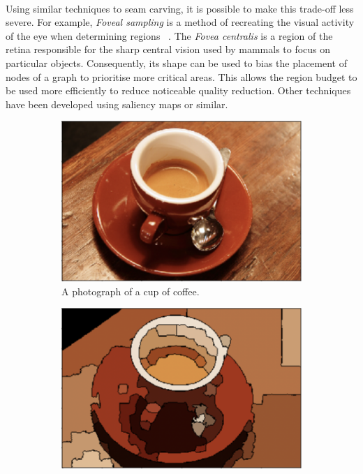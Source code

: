\smallskip \\ \indent
Using similar techniques to seam carving, it is possible to make this trade-off less severe. For example, \textit{Foveal sampling} is a method of recreating the visual activity of the eye when determining regions ~\cite{Foveal}. The \textit{Fovea centralis} is a region of the retina responsible for the sharp central vision used by mammals to focus on particular objects. Consequently, its shape can be used to bias the placement of nodes of a graph to prioritise more critical areas. This allows the region budget to be used more efficiently to reduce noticeable quality reduction. Other techniques have been developed using saliency maps or similar.
\begin{figure}[h!]
    \centering
    \begin{subfigure}[t]{0.29\textwidth}
        \centering
        \captionsetup{justification=centering}
        \includegraphics[scale=0.34]{figures/adjacencyBefore}
        \caption{A photograph of a cup of coffee.}
    \end{subfigure} \hfill%
    \begin{subfigure}[t]{0.29\textwidth}
        \centering
        \captionsetup{justification=centering}
        \includegraphics[scale=0.34]{figures/adjacencyMiddle}

\end{subfigure}
\end{figure}
